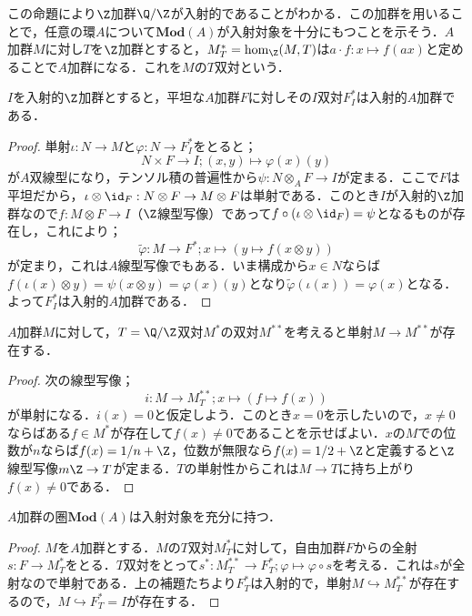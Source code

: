 この命題により$\Z$加群$\Q/\Z$が入射的であることがわかる．この加群を用いることで，任意の環$A$について$\mathbf{Mod}(A)$が入射対象を十分にもつことを示そう．$A$加群$M$に対し$T$を$\Z$加群とすると，$M^\ast_T=\hom_{\Z}(M,T)$は$a\cdot f:x\mapsto f(ax)$と定めることで$A$加群になる．これを$M$の$T$双対という．
\begin{lem}
	$I$を入射的$\Z$加群とすると，平坦な$A$加群$F$に対しその$I$双対$F^\ast_I$は入射的$A$加群である．
\end{lem}
\begin{proof}
	単射$\iota:N\to M$と$\varphi:N\to F^\ast_I$をとると；
	\[N\times F\to I;(x,y)\mapsto \varphi(x)(y)\]
	が$A$双線型になり，テンソル積の普遍性から$\psi:N\otimes_A F\to I$が定まる．ここで$F$は平坦だから，$\iota\otimes\id_F:N\otimes F\to M\otimes F$は単射である．このとき$I$が入射的$\Z$加群なので$f:M\otimes F\to I$（$\Z$線型写像）であって$f\circ(\iota\otimes\id_F)=\psi$となるものが存在し，これにより；
	\[\widetilde\varphi:M\to F^\ast; x\mapsto (y\mapsto f(x\otimes y))\]
	が定まり，これは$A$線型写像でもある．いま構成から$x\in N$ならば$f(\iota(x)\otimes y)=\psi(x\otimes y)=\varphi(x)(y)$となり$\widetilde\varphi(\iota(x))=\varphi(x)$となる．よって$F^\ast_I$は入射的$A$加群である．
\end{proof}
\begin{lem}
	$A$加群$M$に対して，$T=\Q/\Z$双対$M^\ast$の双対$M^{\ast\ast}$を考えると単射$M\to M^{\ast\ast}$が存在する．
\end{lem}
\begin{proof}
	次の線型写像；
	\[i:M\to M^{\ast\ast}_T;x\mapsto (f\mapsto f(x))\]
	が単射になる．$i(x)=0$と仮定しよう．このとき$x=0$を示したいので，$x\neq0$ならばある$f\in M^\ast$が存在して$f(x)\neq0$であることを示せばよい．$x$の$M$での位数が$n$ならば$f(x)=1/n+\Z$，位数が無限なら$f(x)=1/2+\Z$と定義すると$\Z$線型写像$m\Z\to T$が定まる．$T$の単射性からこれは$M\to T$に持ち上がり$f(x)\neq0$である．
\end{proof}

\begin{thm}\label{thm:加群の圏はhas enough injectives}
	$A$加群の圏$\mathbf{Mod}(A)$は入射対象を充分に持つ．
\end{thm}
\begin{proof}
	$M$を$A$加群とする．$M$の$T$双対$M^\ast_T$に対して，自由加群$F$からの全射$s:F\to M^\ast_T$をとる．$T$双対をとって$s^\ast:M^{\ast\ast}_T\to F^\ast_T;\varphi\mapsto\varphi\circ s$を考える．これは$s$が全射なので単射である．上の補題たちより$F^\ast_T$は入射的で，単射$M\hookrightarrow M^{\ast\ast}_T$が存在するので，$M\hookrightarrow F^\ast_T=I$が存在する．
\end{proof}

